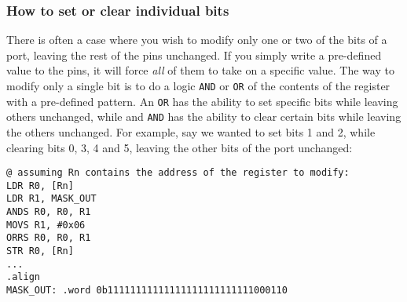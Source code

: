 \subsubsection{How to set or clear individual bits}
\label{sec:set_clear_individual_bits}
There is often a case where you wish to modify only one or two of the bits of a port, leaving the rest of the pins unchanged. If you simply write a pre-defined value to the pins, it will force \emph{all} of them to take on a specific value. The way to modify only a single bit is to do a logic \texttt{AND} or \texttt{OR} of the contents of the register with a pre-defined pattern. An \texttt{OR} has the ability to set specific bits while leaving others unchanged, while and \texttt{AND} has the ability to clear certain bits while leaving the others unchanged. For example, say we wanted to set bits 1 and 2, while clearing bits 0, 3, 4 and 5, leaving the other bits of the port unchanged:
\begin{lstlisting}[fontadjust=true,frame=trBL]
@ assuming Rn contains the address of the register to modify:
LDR R0, [Rn]    
LDR R1, MASK_OUT
ANDS R0, R0, R1
MOVS R1, #0x06
ORRS R0, R0, R1
STR R0, [Rn]
...
.align
MASK_OUT: .word 0b11111111111111111111111111000110
\end{lstlisting}


